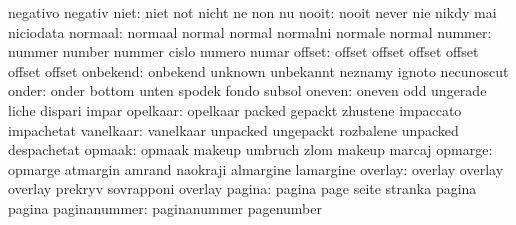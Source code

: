                            negativo                  negativ
                     niet: niet                      not
                           nicht                     ne
                           non                       nu
                    nooit: nooit                     never
                           nie                       nikdy
                           mai                       niciodata
                  normaal: normaal                   normal
                           normal                    normalni
                           normale                   normal
                   nummer: nummer                    number
                           nummer                    cislo
                           numero                    numar
                   offset: offset                    offset
                           offset                    offset
                           offset                    offset
                 onbekend: onbekend                  unknown
                           unbekannt                 neznamy
                           ignoto                    necunoscut
                    onder: onder                     bottom
                           unten                     spodek
                           fondo                     subsol
                   oneven: oneven                    odd
                           ungerade                  liche
                           dispari                   impar
                 opelkaar: opelkaar                  packed
                           gepackt                   zhustene
                           impaccato                 impachetat
                vanelkaar: vanelkaar                 unpacked
                           ungepackt                 rozbalene
                           unpacked                  despachetat
                   opmaak: opmaak                    makeup
                           umbruch                   zlom
                           makeup                    marcaj
                  opmarge: opmarge                   atmargin
                           amrand                    naokraji
                           almargine                 lamargine
                  overlay: overlay                   overlay
                           overlay                   prekryv
                           sovrapponi                overlay
                   pagina: pagina                    page
                           seite                     stranka
                           pagina                    pagina
             paginanummer: paginanummer              pagenumber
